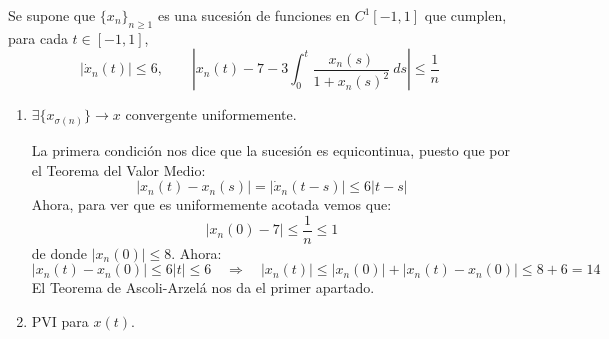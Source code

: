 \begin{ejercicio}
    Se supone que $\{x_n\}_{n\geq 1}$ es una sucesión de funciones en $C^1[-1,1]$ que cumplen, para cada $t\in [-1,1]$,
    \begin{equation*}
        |\dot{x}_n(t)| \leq 6, \qquad \left|x_n(t) - 7 - 3 \int_{0}^{t} \frac{x_n(s)}{1+x_n(s)^2}~ds \right| \leq \frac{1}{n}
    \end{equation*}
    \begin{enumerate}
        \item[$i)$] $\exists \{x_{\sigma(n)}\}\to x$ convergente uniformemente.

            La primera condición nos dice que la sucesión es equicontinua, puesto que por el Teorema del Valor Medio:
            \begin{equation*}
                |x_n(t) - x_n(s)| = |\dot{x}_n(t-s)| \leq 6 |t-s|
            \end{equation*}
            Ahora, para ver que es uniformemente acotada vemos que:
            \begin{equation*}
                |x_n(0) - 7| \leq \frac{1}{n} \leq 1
            \end{equation*}
            de donde $|x_n(0)|\leq 8$. Ahora:
            \begin{equation*}
                |x_n(t) - x_n(0)| \leq 6 |t| \leq 6 \quad\Longrightarrow\quad|x_n(t)| \leq |x_n(0)| + |x_n(t) - x_n(0)| \leq 8 + 6 = 14
            \end{equation*}
            El Teorema de Ascoli-Arzelá nos da el primer apartado.
        \item[$ii)$] PVI para $x(t)$.


\end{enumerate}
\end{ejercicio}
